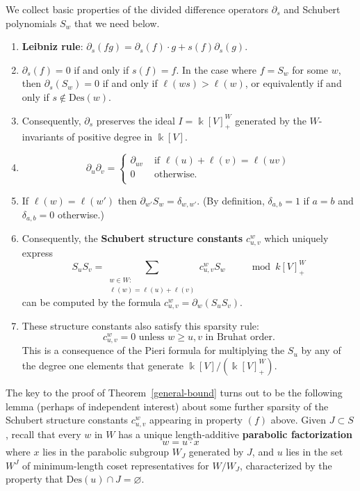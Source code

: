 \documentclass[12pt,dvips]{amsart}
\theoremstyle{plain}
\theoremstyle{definition}
\theoremstyle{remark}
\numberwithin{equation}{section}
\def\Des{\mathrm{Des}}
\begin{document}
  We collect basic properties of the divided difference operators $\partial_s$ and 
Schubert polynomials $S_w$ that we need below.
\begin{enumerate}
\item[(a)] {\bf Leibniz rule}:  $\partial_s (fg) = \partial_s(f) \cdot g + s(f) \partial_s(g).$
\item[(b)] $\partial_s(f)=0$ if and only if $s(f)=f$.  In the case where $f=S_w$ for some $w$, then
$\partial_s(S_w)=0$ if and only if $\ell(ws) > \ell(w)$, or equivalently if and only if $s \not\in \Des(w)$.
\item[(c)] Consequently, $\partial_s$ preserves the ideal 
$I= \Bbbk[V]^W_+$ generated
by the $W$-invariants of positive degree in $\Bbbk[V]$.
\item[(d)] 
$$
\partial_u \partial_v = 
  \begin{cases} 
    \partial_{uv}& \text{ if }\ell(u)+\ell(v)=\ell(uv)\\
    0          & \text{ otherwise.}\\
  \end{cases}
$$
\item[(e)] If $\ell(w)=\ell(w')$ then $\partial_{w'} S_w =
\delta_{w,w'}$.  (By definition, $\delta_{a,b}=1$ if $a=b$ and
$\delta_{a,b}=0$ otherwise.)
\item[(f)] Consequently, the {\bf Schubert structure constants} $c_{u,v}^w$ 
which uniquely express
$$
S_u S_v = \sum_{\substack{w \in W:\\ \ell(w)=\ell(u)+\ell(v)}} 
   c_{u,v}^w  S_w \qquad \mod k[V]^W_+
$$
can be computed by the formula $c_{u,v}^w= \partial_w \left( S_u S_v \right)$.
\item[(g)] These structure constants also satisfy this sparsity rule:
$$
c_{u,v}^w=0 \text{  unless }w \geq u,v\text{ in Bruhat order.}
$$  
This is a consequence of the Pieri
formula \cite[\S IV.3]{Hiller} for multiplying the $S_u$ by any of the
degree one elements that generate $\Bbbk[V]/(\Bbbk[V]^W_+)$.
\end{enumerate}


The key to the proof of Theorem~\ref{general-bound} turns
out to be the following lemma (perhaps of independent interest)
about some further sparsity of the Schubert structure
constants $c_{u,v}^w$ appearing in property $(f)$ above.
Given $J \subset S$, recall 
that every $w$ in $W$ has a unique length-additive 
{\bf parabolic factorization} 
$$
w=u \cdot x
$$ 
where $x$ lies in the parabolic subgroup $W_J$ generated by $J$,
and $u$ lies in the set $W^J$ of minimum-length coset representatives
for $W/W_J$, characterized by the property that \linebreak
$\Des(u) \cap J = \varnothing$.
\end{document}
